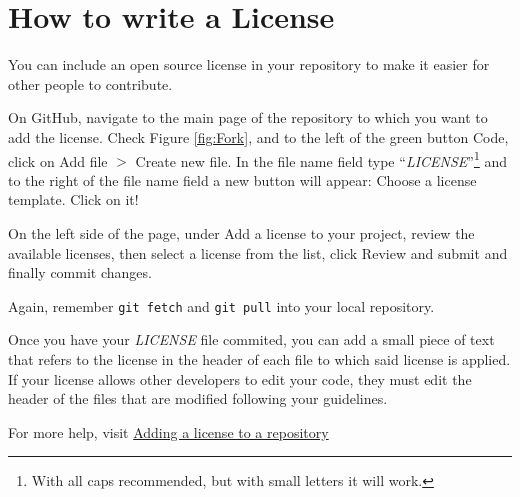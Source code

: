 \section{How to write a License}

You can include an open source license in your repository to make it easier for other people to contribute.

On \textsf{GitHub}, navigate to the main page of the repository to which you want to add the license. Check Figure \ref{fig:Fork}, and to the left of the green button \textsf{Code}, click on \textsf{Add file} $>$ \textsf{Create new file}. In the file name field type ``\textit{LICENSE}''\footnote{With all caps recommended, but with small letters it will work.} and to the right of the file name field a new button will appear: \textsf{Choose a license template}. Click on it!

On the left side of the page, under \textsf{Add a license to your project}, review the available licenses, then select a license from the list, click \textsf{Review and submit} and finally commit changes.

Again, remember \texttt{git fetch} and \texttt{git pull} into your local repository.

Once you have your \textit{LICENSE} file commited, you can add a small piece of text that refers to the license in the header of each file to which said license is applied. If your license allows other developers to edit your code, they must edit the header of the files that are modified following your guidelines.

For more help, visit \href{https://docs.github.com/en/communities/setting-up-your-project-for-healthy-contributions/adding-a-license-to-a-repository}{\textsf{Adding a license to a repository}}

